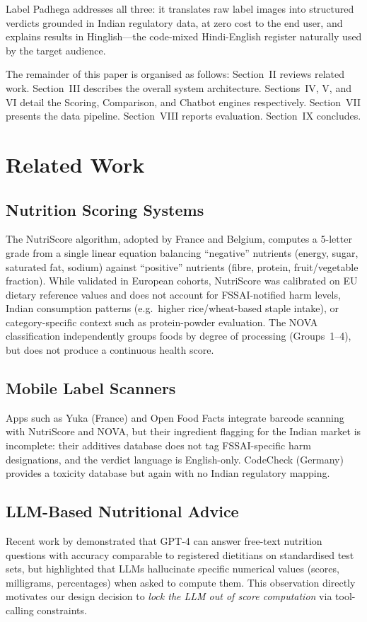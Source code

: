 \documentclass[conference]{IEEEtran}
\begin{document}
Label Padhega addresses all three: it translates raw label images into structured
verdicts grounded in Indian regulatory data, at zero cost to the end user, and
explains results in Hinglish---the code-mixed Hindi-English register naturally
used by the target audience.

The remainder of this paper is organised as follows: Section~II reviews related work.
Section~III describes the overall system architecture. Sections~IV, V, and VI
detail the Scoring, Comparison, and Chatbot engines respectively. Section~VII
presents the data pipeline. Section~VIII reports evaluation. Section~IX concludes.

\section{Related Work}

\subsection{Nutrition Scoring Systems}
The NutriScore \cite{nutriscore} algorithm, adopted by France and Belgium, computes
a 5-letter grade from a single linear equation balancing ``negative'' nutrients
(energy, sugar, saturated fat, sodium) against ``positive'' nutrients
(fibre, protein, fruit/vegetable fraction).
While validated in European cohorts, NutriScore was calibrated on EU dietary
reference values and does not account for FSSAI-notified harm levels, Indian
consumption patterns (e.g.\ higher rice/wheat-based staple intake), or
category-specific context such as protein-powder evaluation.
The NOVA classification \cite{nova_monteiro} independently groups foods by degree
of processing (Groups~1--4), but does not produce a continuous health score.

\subsection{Mobile Label Scanners}
Apps such as Yuka (France) and Open Food Facts integrate barcode scanning with
NutriScore and NOVA, but their ingredient flagging for the Indian market is
incomplete: their additives database does not tag FSSAI-specific harm designations,
and the verdict language is English-only. CodeCheck (Germany) provides a toxicity
database but again with no Indian regulatory mapping.

\subsection{LLM-Based Nutritional Advice}
Recent work by \citeauthor{llm_nutrition_2024} \cite{llm_nutrition_2024} demonstrated
that GPT-4 can answer free-text nutrition questions with accuracy comparable to
registered dietitians on standardised test sets, but highlighted that LLMs
hallucinate specific numerical values (scores, milligrams, percentages) when
asked to compute them. This observation directly motivates our design decision
to \textit{lock the LLM out of score computation} via tool-calling constraints.
\end{document}
